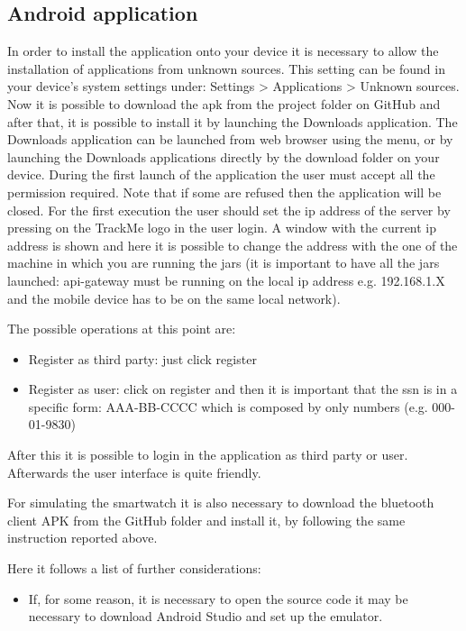 \subsection{Android application}
In order to install the application onto your device it is necessary to allow the installation of applications from unknown sources. This setting can be found in your device's system settings under: Settings > Applications > Unknown sources. 
\\
Now it is possible to download the apk from the project folder on GitHub and after that, it is possible to install it by launching the Downloads application. The Downloads application can be launched from web browser using the menu, or by launching the 
Downloads applications directly by the download folder on your device. During the first launch of the application the user must 
accept all the permission required. Note that if some are refused then the application will be closed. For the first execution the 
user should set the ip address of the server by pressing on the TrackMe logo in the user login. A window with the current ip 
address is shown and here it is possible to change the address with the one of the machine in which you are running the jars (it is 
important to have all the jars launched: api-gateway must be running on the local ip address e.g. 192.168.1.X and the mobile device 
has to be on the same local network).

\par
The possible operations at this point are:
\begin{itemize}
\item Register as third party: just click register
\item Register as user: click on register and then it is important that the ssn is in a specific form: AAA-BB-CCCC which is composed by only numbers (e.g. 000-01-9830) 
\end{itemize}
After this it is possible to login in the application as third party or user. Afterwards the user interface is quite friendly.

\par

For simulating the smartwatch it is also necessary to download the bluetooth client APK from the GitHub folder and install it, by following the same instruction reported above.

\par 
Here it follows a list of further considerations: 
\begin{itemize}
\item If, for some reason, it is necessary to open the source code it may be necessary to download Android Studio and set up the emulator. \\
\end{itemize}

